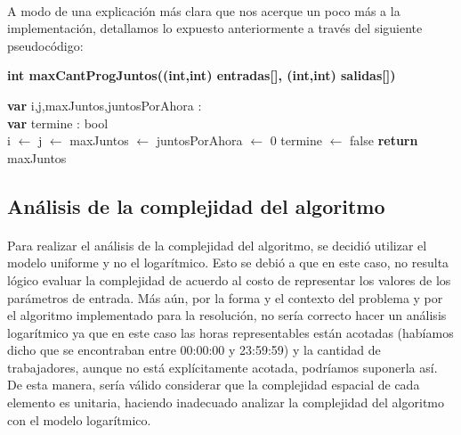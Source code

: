 \paragraph{}
A modo de una explicaci\'on m\'as clara que nos acerque un poco m\'as a la implementaci\'on, detallamos lo expuesto anteriormente a trav\'es del siguiente pseudoc\'odigo:

	\incmargin{1em}
	\linesnumbered
	\textbf{int maxCantProgJuntos((int,int) entradas[], (int,int) salidas[])}\\
		\begin{algorithm}[H]
			\BlankLine
			\textbf{var} i,j,maxJuntos,juntosPorAhora : \entero \\
			\textbf{var} termine : bool \\
			\BlankLine
			i $\leftarrow$ j $\leftarrow$ maxJuntos $\leftarrow$ juntosPorAhora $\leftarrow$ 0
			termine $\leftarrow$ false
			\BlankLine
			\BlankLine
			\textbf{return} maxJuntos
		\end{algorithm}


\subsection{Análisis de la complejidad del algoritmo}

\paragraph{}
Para realizar el análisis de la complejidad del algoritmo, se decidió utilizar el modelo uniforme y no el logarítmico. Esto se debió a que en este caso, no resulta lógico evaluar la complejidad de acuerdo al costo de representar los valores de los parámetros de entrada. Más aún, por la forma y el contexto del problema y por el algoritmo implementado para la resolución, no sería correcto hacer un análisis logarítmico ya que en este caso las horas representables están acotadas (habíamos dicho que se encontraban entre 00:00:00 y 23:59:59) y la cantidad de trabajadores, aunque no está explícitamente acotada, podríamos suponerla así. De esta manera, sería válido considerar que la complejidad espacial de cada elemento es unitaria, haciendo inadecuado analizar la complejidad del algoritmo con el modelo logarítmico.

